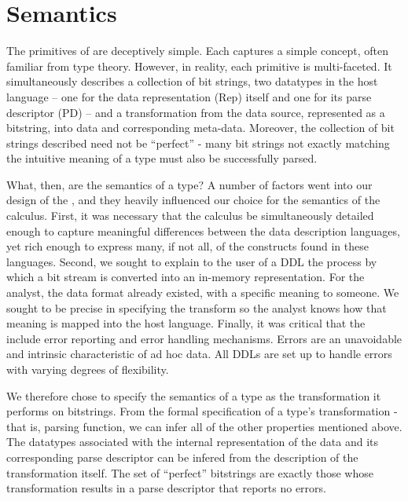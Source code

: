 \section{\ddc{} Semantics}

The primitives of \ddc{} are deceptively simple.  Each captures a
simple concept, often familiar from type theory. However, in reality,
each primitive is multi-faceted. It simultaneously describes a
collection of bit strings, two datatypes in the host language -- one
for the data representation (Rep) itself and one for its parse
descriptor (PD) -- and a transformation from the data source, represented as a bitstring, into data and
corresponding meta-data. Moreover, the collection of bit strings
described need not be ``perfect'' - many bit strings not exactly
matching the intuitive meaning of a type must also be successfully
parsed.



What, then, are the semantics of a type? A number of factors went into
our design of the \ddc{}, and they heavily influenced our choice for
the semantics of the calculus. First, it was necessary that the
calculus be simultaneously detailed enough to capture meaningful
differences between the data description languages, yet rich enough to
express many, if not all, of the constructs found in these languages.
Second, we sought to explain to the user of a DDL the process by which
a bit stream is converted into an in-memory representation. For the
analyst, the data format already existed, with a specific meaning to
someone. We sought to be precise in specifying the transform so the
analyst knows how that meaning is mapped into the host language.
Finally, it was critical that the \ddc{} include error reporting and
error handling mechanisms. Errors are an unavoidable and intrinsic
characteristic of ad hoc data. All DDLs are set up to handle errors
with varying degrees of flexibility.

We therefore chose to specify the semantics of a type as the
transformation it performs on bitstrings. From the formal
specification of a type's transformation - that is, parsing function,
we can infer all of the other properties mentioned above.  The
datatypes associated with the internal representation of the data and
its corresponding parse descriptor can be infered from the description
of the transformation itself. The set of ``perfect'' bitstrings are
exactly those whose transformation results in a parse descriptor that
reports no errors.


